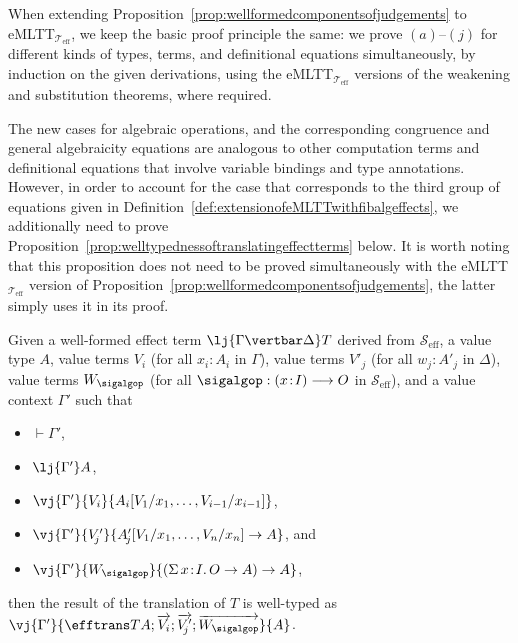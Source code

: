 When extending Proposition~\ref{prop:wellformedcomponentsofjudgements} to eMLTT$_{\mathcal{T}_{\text{eff}}}$, we keep the basic proof principle the same: we prove $(a)$--$(j)$ for different kinds of types, terms, and definitional equations simultaneously, by induction on the given derivations, using the eMLTT$_{\mathcal{T}_{\text{eff}}}$ versions of the weakening and substitution theorems, where required.

The new cases for algebraic operations,  and the corresponding congruence and general algebraicity equations are analogous to other computation terms and definitional equations that involve variable bindings and type annotations. However, in order to account for the case that corresponds to the third group of equations given in Definition~\ref{def:extensionofeMLTTwithfibalgeffects}, we additionally need to prove Proposition~\ref{prop:welltypednessoftranslatingeffectterms} below. It is worth noting that this  proposition does not need to be proved simultaneously with the eMLTT$_{\mathcal{T}_{\text{eff}}}$ version of Proposition~\ref{prop:wellformedcomponentsofjudgements}, the latter simply uses it in its proof.


\begin{proposition}
\label{prop:welltypednessoftranslatingeffectterms}
Given a well-formed effect term $\lj {\Gamma \vertbar \Delta} T$ derived from $\mathcal{S}_{\text{eff}}$, a value type $A$, value terms $V_{i}$ (for all $x_i \!:\! A_i$ in $\Gamma$), value terms $V'_{\!j}$ (for all $w_{\!j} \!:\! A'_{\!j}$ in $\Delta$), value terms $W_{\sigalgop}$ (for all $\sigalgop : (x \!:\! I) \longrightarrow O$ in $\mathcal{S}_{\text{eff}}$), and a value context $\Gamma'$ such that
\begin{itemize}
\item $\vdash \Gamma'$, 
\item $\lj {\Gamma'} A$, 
\item $\vj {\Gamma'} {V_i} {A_i[V_1/x_1, \ldots, V_{i-1}/x_{i-1}]}$,  
\item $\vj {\Gamma'} {V'_{\!j}} {A'_{\!j}[V_1/x_1, \ldots, V_n/x_n] \to A}$, and 
\item $\vj {\Gamma'} {W_{\sigalgop}} {(\Sigma\, x \!:\! I .\, O \to A) \to A}$,  
\end{itemize}
then 
the result of the translation of $T$ is well-typed as $\vj {\Gamma'} {\efftrans T {A; \overrightarrow{V_i}; \overrightarrow{V'_{\!j}}; \overrightarrow{W_{\sigalgop}}}} {A}$.
\end{proposition}

